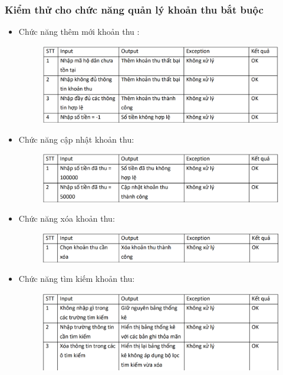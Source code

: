 \documentclass{article}
\begin{document}
\subsubsection{Kiểm thử cho chức năng quản lý khoản thu bắt buộc}
\begin{itemize}
    \item Chức năng thêm mới khoản thu :
    \begin{figure}[H]
        \centering
        \includegraphics[width=1\textwidth]{Kiểm thử phí bắt buộc/Screenshot 2024-12-14 002802.png}
    \end{figure}
    \item Chức năng cập nhật khoản thu:
    \begin{figure}[H]
        \centering
        \includegraphics[width=1\textwidth]{Kiểm thử phí bắt buộc/Screenshot 2024-12-14 002808.png}
    \end{figure}
    \vspace{1cm}
    \item Chức năng xóa khoản thu:
    \begin{figure}[H]
        \centering
        \includegraphics[width=1\textwidth]{Kiểm thử phí bắt buộc/Screenshot 2024-12-14 002812.png}
    \end{figure}
    \item Chức năng tìm kiếm khoản thu:
    \begin{figure}[H]
        \centering
        \includegraphics[width=1\textwidth]{Kiểm thử phí bắt buộc/Screenshot 2024-12-14 002822.png}
    \end{figure}
\end{itemize}
\end{document}
